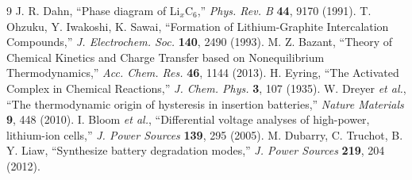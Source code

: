 \documentclass[11pt,a4paper]{article}
\begin{document}
\begin{thebibliography}{9}
 J. R. Dahn, ``Phase diagram of Li$_x$C$_6$,'' \emph{Phys. Rev. B} \textbf{44}, 9170 (1991).
 T. Ohzuku, Y. Iwakoshi, K. Sawai, ``Formation of Lithium-Graphite Intercalation Compounds,'' \emph{J. Electrochem. Soc.} \textbf{140}, 2490 (1993).
 M. Z. Bazant, ``Theory of Chemical Kinetics and Charge Transfer based on Nonequilibrium Thermodynamics,'' \emph{Acc. Chem. Res.} \textbf{46}, 1144 (2013).
 H. Eyring, ``The Activated Complex in Chemical Reactions,'' \emph{J. Chem. Phys.} \textbf{3}, 107 (1935).
 W. Dreyer \emph{et al.}, ``The thermodynamic origin of hysteresis in insertion batteries,'' \emph{Nature Materials} \textbf{9}, 448 (2010).
 I. Bloom \emph{et al.}, ``Differential voltage analyses of high-power, lithium-ion cells,'' \emph{J. Power Sources} \textbf{139}, 295 (2005).
 M. Dubarry, C. Truchot, B. Y. Liaw, ``Synthesize battery degradation modes,'' \emph{J. Power Sources} \textbf{219}, 204 (2012).
\end{thebibliography}
\end{document}
